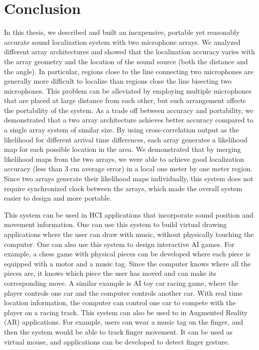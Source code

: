 \chapter{Conclusion}
In this thesis, we described and built an inexpensive, portable yet reasonably accurate sound localization system with two microphone arrays. We analyzed different array architectures and showed that the localization accuracy varies with the array geometry and the location of the sound source (both the distance and the angle). In particular, regions close to the line connecting two microphones are generally more difficult to localize than regions close the line bisecting two microphones. This problem can be alleviated by employing multiple microphones that are placed at large distance from each other, but such arrangement affects the portability of the system. As a trade off between accuracy and portability, we demonstrated that a two array architecture achieves better accuracy compared to a single array system of similar size. By using cross-correlation output as the likelihood for different arrival time differences, each array generates a likelihood map for each possible location in the area. We demonstrated that by merging likelihood maps from the two arrays, we were able to achieve good localization accuracy (less than $3$ cm average error) in a local one meter by one meter region. Since two arrays generate their likelihood maps individually, this system does not require synchronized clock between the arrays, which made the overall system easier to design and more portable.

This system can be used in HCI applications that incorporate sound position and movement information. One can use this system to build virtual drawing applications where the user can draw with music, without physically touching the computer. One can also use this system to design interactive AI games. For example, a chess game with physical pieces can be developed where each piece is equipped with a motor and a music tag. Since the computer knows where all the pieces are, it knows which piece the user has moved and can make its corresponding move. A similar example is AI toy car racing game, where the player controls one car and the computer controls another car. With real time location information, the computer can control one car to compete with the player on a racing track. This system can also be used to in Augmented Reality (AR) applications. For example, users can wear a music tag on the finger, and then the system would be able to track finger movement. It can be used as virtual mouse, and applications can be developed to detect finger gesture.

